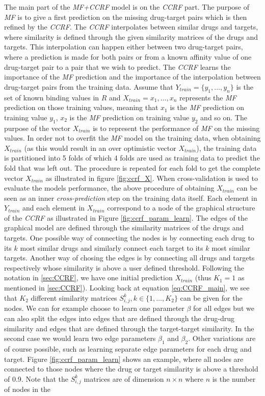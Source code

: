 The main part of the \textit{MF+CCRF} model is on the \textit{CCRF} part. The purpose of \textit{MF} is to give a first prediction on the missing drug-target pairs which is then refined by the \textit{CCRF}. The \textit{CCRF} interpolates between similar drugs and targets, where similarity is defined through the given similarity matrices of the drugs and targets. This interpolation can happen either between two drug-target pairs, where a prediction is made for both pairs or from a known affinity value of one drug-target pair to a pair that we wish to predict. The \textit{CCRF} learns the importance of the \textit{MF} prediction and the importance of the interpolation between drug-target pairs from the training data.
Assume that $Y_{train} = \{y_1, \dots, y_n\}$ is the set of known binding values in $R$ and $X_{train}={x_1,\dots,x_n}$ represents the \textit{MF} prediction on those training values, meaning that $x_1$ is the \textit{MF} prediction on training value $y_1$, $x_2$ is the \textit{MF} prediction on training value $y_2$ and so on. The purpose of the vector $X_{train}$ is to represent the performance of \textit{MF} on the missing values. In order not to overfit the \textit{MF} model on the training data, when obtaining $X_{train}$ (as this would result in an over optimistic vector $X_{train}$), the training data is partitioned into 5 folds of which 4 folds are used as training data to predict the fold that was left out. The procedure is repeated for each fold to get the complete vector $X_{train}$ as illustrated in figure \ref{fig:ccrf_X}. When cross-validation is used to evaluate the models performance, the above procedure of obtaining $X_{train}$ can be seen as an inner \textit{cross-prediction} step on the training data itself. Each element in $Y_{train}$ and each element in $X_{train}$ correspond to a node of the graphical structure of the \textit{CCRF} as illustrated in Figure \ref{fig:ccrf_param_learn}. The edges of the graphical model are defined through the similarity matrices of the drugs and targets. One possible way of connecting the nodes is by connecting each drug to its $k$ most similar drugs and similarly connect each target to its $k$ most similar targets. Another way of chosing the edges is by connecting all drugs and targets respectively whose similarity is above a user defined threshold. Following the notation in \ref{sec:CCRF}, we have one initial prediction $X_{train}$ (thus $K_1=1$ as mentioned in \ref{sec:CCRF}). Looking back at equation \ref{eq:CCRF_main}, we see that $K_2$ different similarity matrices $S_{i,j}^k, k \in \{1,\dots,K_2\}$ can be given for the nodes. We can for example choose to learn one parameter $\beta$ for all edges but we can also split the edges into edges that are defined through the drug-drug similarity and edges that are defined through the target-target similarity. In the second case we would learn two edge parameters $\beta_1$ and $\beta_2$. Other variations are of course possible, such as learning separate edge parameters for each drug and target. Figure \ref{fig:ccrf_param_learn} shows an example, where all nodes are connected to those nodes where the drug or target similarity is above a threshold of 0.9. Note that the $S_{i,j}^k$ matrices are of dimension $n \times n$ where $n$ is the number of nodes in the 